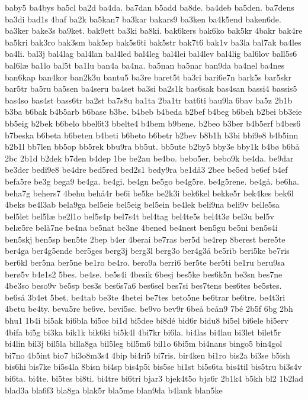 {baby5
ba4bys
ba5cl
ba2d
ba4da.
ba7dan
b5add
ba8de.
ba4deb
ba5den.
ba7dens
ba3di
bad1s
4baf
ba2k
ba5kan7
ba3kar
bakars9
ba3ken
ba4k5end
baken6de.
ba3ker
bake3s
ba9ket.
bak9ett
ba3ki
ba8ki.
bak6kers
bak6ko
bak5kr
4bakr
bak4re
ba5kri
bak3ro
bak3sm
bak5sp
bak5s6ti
bak5str
bak7t6
bak1v
ba3la
bal7ak
ba4les
ba4li.
bal3j
bal4lag
bal4lan
bal4led
bal4leg
bal4lei
bal4lev
bal4lig
bal6lov
ball5s6
bal6læ
ba1lo
bal5t
ba1lu
ban4a
ba4na.
ba5nan
ba5nar
ban9da
ba4nel
ba4nes
ban6kap
ban4kor
ban2k3u
bantu5
ba3re
baret5t
ba3ri
bari6e7n
bark5s
bar5skr
bar5tr
ba5ru
ba5sen
ba4seru
ba4set
ba3si
ba2s1k
bas6sak
bas4san
bassi4
bassis5
bas4so
bas4st
bass6tr
ba2st
ba7s8u
ba1ta
2ba1tr
bat6ti
bau9la
6bav
ba5z
2b1b
b3ba
b6bak
b4b5arb
b6base
b3be.
b4beb
b4beda
b2bef
b4beg
b6beh
b2bei
bb3eie
bb5eig
b2bek
b6belo
bbel6t3
bbelte4
b4bem
b9bene.
b2beo
b3ber
b4b5erf
b4bes6
b7beska
b6beta
b6beten
b4beti
b6beto
b6betr
b2bev
b8b1h
b3bi
bbi9e8
b4b5inn
b2b1l
bb7len
bb5op
bb5rek
bbu9ra
bb5ut.
bb5ute
b2by5
bby3e
bby1k
b4bø
b6bå
2bc
2b1d
b2dek
b7den
b4dep
1be
be2au
be4bo.
bebo5er.
bebo9k
be4da.
be9dar
be3der
bedi9e8
be4dre
bed5red
bed2s1
bedy9ra
be1då3
2bee
be5ed
be6ef
b4ef
befa5re
be3g
bega9
be4ga.
be4gi.
be4gn
be5go
be4g5re.
be4g5rene.
be4gå.
be6ha.
beha7g
behers7
4behu
behå4r
be6i
be5ke
be2k3i
bek6kel
bekke5r
bek4kes
bek6l
4beks
be4l3ab
bela9ga
bel5eie
bel5eig
bel5ein
be4lek
beli9na
beli9v
belle5sa
bel5let
bel5læ
be2l1o
bel5s4p
bel7s4t
bel4tag
bel4te5s
bel4t3ø
bel3u
bel5v
belæ5re
belå7ne
be4na
be5nat
be3ne
4bened
be4nest
ben5gu
be5ni
ben5s4i
ben5skj
ben5sp
ben5te
2bep
b4er
4berai
be7ras
ber5d
be4rep
8berest
bere5te
ber4ga
ber4g5ende
ber5ges
berg3j
berg3l
berg3o
ber4g3å
be5rib
beri5ke
be7ris
ber6kl
ber5na
ber5ne
be1ro
be4ro.
bero9a
berri6
ber5te
ber5ti
be1ru
beru9sa
berø5v
b4e1s2
5bes.
be4se.
be5s4i
4besik
6besj
bes5ke
bes6k5n
be3sn
bes7ne
4be3so
beso9v
be5sp
bes3s
bes6s7a6
bes6sel
bes7si
bes7tens
bes6tes
be5stes.
be6så
3b4et
5bet.
be4tab
be3te
4betei
be7tes
beto5ne
be6trar
be6tre.
be4t3ri
4betu
be4ty.
beva5re
be6ve.
bevi5se.
be9vo
bev9r
6beå
beån9
7bé
2b5f
6bg
2bh
bhu1
1b4i
bi5ak
bi6bla
bi5ce
bi1d
bi5dee
bi8dé
bid6r
bidu8
bi5el
bi6ele
bi5erv
4bifa
bi5g
bi3ka
bik1k
bik6ki
bi5k4l
4bi7kr
bi6la.
bi4las
bi4lau
bi3let
bilet5r
bi4lin
bil3j
bil5la
billa8ga
bil5leg
bil5m6
bil1o
6bi5m
bi4nans
bingo5
bin4gol
bi7no
4b5int
bio7
bi3o8m3s4
4bip
bi4ri5
bi7ris.
bir4ken
bi1ro
bis2a
bi3se
b5ish
bis6hi
bis7ke
bi5s4la
8bisn
bi4sp
bis4p5i
bis5se
bi1st
bi5s6ta
bis4til
bis5tru
bi3s4v
bi6ta.
bi4te.
bi5tes
bi8ti.
bi4tre
bi6tri
bjar3
bjek4t5o
bjø6r
2b1k4
b5kh
bl2
1b2lad
blad3a
bla6f3
bla8ga
blak5r
bla5me
blan9da
b4lank
blan5ke
}
